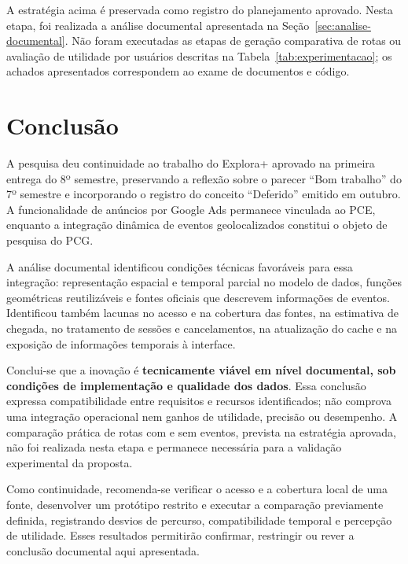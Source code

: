 \documentclass[12pt, a4paper]{article}
\begin{document}
A estratégia acima é preservada como registro do planejamento aprovado. Nesta etapa, foi realizada a análise documental apresentada na Seção~\ref{sec:analise-documental}. Não foram executadas as etapas de geração comparativa de rotas ou avaliação de utilidade por usuários descritas na Tabela~\ref{tab:experimentacao}; os achados apresentados correspondem ao exame de documentos e código.
\clearpage


\clearpage
\section{Conclusão}

A pesquisa deu continuidade ao trabalho do Explora+ aprovado na primeira entrega do 8º semestre, preservando a reflexão sobre o parecer “Bom trabalho” do 7º semestre e incorporando o registro do conceito “Deferido” emitido em outubro. A funcionalidade de anúncios por Google Ads permanece vinculada ao PCE, enquanto a integração dinâmica de eventos geolocalizados constitui o objeto de pesquisa do PCG.

A análise documental identificou condições técnicas favoráveis para essa integração: representação espacial e temporal parcial no modelo de dados, funções geométricas reutilizáveis e fontes oficiais que descrevem informações de eventos. Identificou também lacunas no acesso e na cobertura das fontes, na estimativa de chegada, no tratamento de sessões e cancelamentos, na atualização do cache e na exposição de informações temporais à interface.

Conclui-se que a inovação é \textbf{tecnicamente viável em nível documental, sob condições de implementação e qualidade dos dados}. Essa conclusão expressa compatibilidade entre requisitos e recursos identificados; não comprova uma integração operacional nem ganhos de utilidade, precisão ou desempenho. A comparação prática de rotas com e sem eventos, prevista na estratégia aprovada, não foi realizada nesta etapa e permanece necessária para a validação experimental da proposta.

Como continuidade, recomenda-se verificar o acesso e a cobertura local de uma fonte, desenvolver um protótipo restrito e executar a comparação previamente definida, registrando desvios de percurso, compatibilidade temporal e percepção de utilidade. Esses resultados permitirão confirmar, restringir ou rever a conclusão documental aqui apresentada.
\clearpage
{}
\printbibliography[heading=bibintoc,title={Refer\^encias}]
\end{document}
